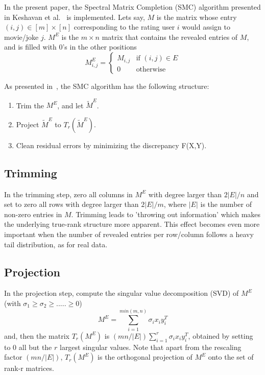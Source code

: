 In the present paper, the Spectral Matrix Completion (SMC) algorithm presented in Keshavan et al.~\cite{keshavan2010matrix} is implemented. Lets say, $M$ is the matrix whose entry $(i,j) \in [m] \times [n]$ corresponding to the rating user $i$ would assign to movie/joke $j$. $M^E$ is the $m \times n$ matrix that contains the revealed entries of $M$, and is filled with 0's in the other positions 
\begin{equation}
M^E_{i,j} = \left \{ \begin{array}{rcl}
	M_{i,j} & \mbox{if  }  (i,j) \in E \\
	 0 & \mbox{otherwise} 
	\end{array} \right.
\end{equation}

As presented in~\cite{keshavan2010matrix}, the SMC algorithm has the following structure:
\begin{enumerate}
\item Trim the $M^E$, and let $\widetilde{M}^E$.
\item Project $\widetilde{M}^E$ to $T_r(\widetilde{M}^E)$.
\item Clean residual errors by minimizing the discrepancy F(X,Y).
\end{enumerate}

\subsection{Trimming}
In the trimming step, zero all columns in $M^E$ with degree larger than $2|E|/n$ and set to zero all rows with degree larger than $2|E|/m$, where $|E|$ is the number of non-zero entries in $M$. Trimming leads to 'throwing out information' which makes the underlying true-rank structure more apparent. This effect becomes even more important when the number
of revealed entries per row/column follows a heavy tail distribution, as for real data.

\subsection{Projection}
In the projection step, compute the singular value decomposition (SVD) of $M^E$ (with $\sigma_1 \ge \sigma_2 \ge .....\ge 0$)
\begin{equation}
M^E = \sum\limits_{i=1}^{min(m,n)} \sigma_ix_iy_i^T
\end{equation}
and, then the matrix $T_r(M^E)$ is $(mn/|E|)\sum\limits_{i=1}^r \sigma_ix_iy_i^T$, obtained by setting to 0 all but the $r$ largest singular values. Note that apart from the rescaling factor $(mn/|E|)$, $T_r(M^E)$ is the orthogonal projection of $M^E$ onto the set of rank-r matrices. 

